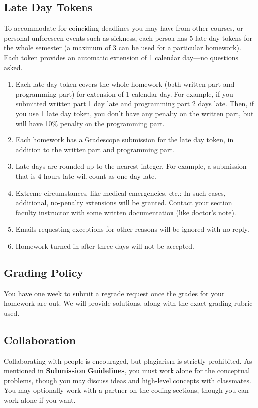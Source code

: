 \documentclass{homework}
\begin{document}
\subsection*{Late Day Tokens}
To accommodate for coinciding deadlines you may have from other courses, or personal unforeseen events such as sickness, each person has 5 late-day tokens for the whole semester (a maximum of 3 can be used for a particular homework). Each token provides an automatic extension of 1 calendar day---no questions asked.
\begin{enumerate}
    \item Each late day token covers the whole homework (both written part and programming part) for extension of 1 calendar day. For example, if you submitted written part 1 day late and programming part 2 days late. Then, if you use 1 late day token, you don't have any penalty on the written part, but will have 10\% penalty on the programming part.
    \item Each homework has a Gradescope submission for the late day token, in addition to the written part and programming part.
    \item Late days are rounded up to the nearest integer. For example, a submission that is 4 hours late will count as one day late.
    \item Extreme circumstances, like medical emergencies, etc.: In such cases, additional, no-penalty extensions will be granted. Contact your section faculty instructor with some written documentation (like doctor's note). 
    \item Emails requesting exceptions for other reasons will be ignored with no reply.
    \item Homework turned in after three days will not be accepted.

\end{enumerate}
\subsection*{Grading Policy}
You have one week to submit a regrade request once the grades for your homework are out. We will provide solutions, along with the exact grading rubric used. 
\subsection*{Collaboration}
Collaborating with people is encouraged, but plagiarism is strictly prohibited. As mentioned in \textbf{Submission Guidelines}, you must work alone for the conceptual problems, though you may discuss ideas and high-level
concepts with classmates. You may optionally work with a partner on the coding sections, though you can work alone if you want.
\end{document}
